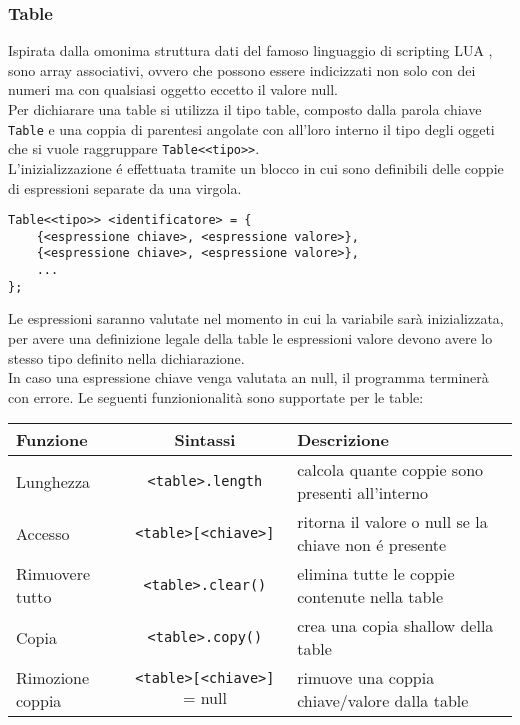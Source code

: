\subsubsection{Table}
Ispirata dalla omonima struttura dati del famoso linguaggio di scripting LUA \cite{LUA},
sono array associativi, ovvero che possono essere indicizzati non solo con dei 
numeri ma con qualsiasi oggetto eccetto il valore null. \\
Per dichiarare una table si utilizza il tipo table, composto dalla parola chiave
\lstinline|Table| e una coppia di parentesi angolate con all'loro interno il tipo degli 
oggeti che si vuole raggruppare \lstinline|Table<<tipo>>|. \\
L'inizializzazione é effettuata tramite un blocco in cui sono definibili delle coppie
di espressioni separate da una virgola.
\begin{lstlisting}
Table<<tipo>> <identificatore> = {
    {<espressione chiave>, <espressione valore>},
    {<espressione chiave>, <espressione valore>},
    ...
};
\end{lstlisting}
Le espressioni saranno valutate nel momento in cui la variabile sarà inizializzata,
per avere una definizione legale della table le espressioni valore devono avere 
lo stesso tipo definito nella dichiarazione. \\
In caso una espressione chiave venga valutata an null, il programma terminerà con errore.
Le seguenti funzionionalità sono supportate per le table: \\
\begin{center}
\begin{tabularx}{\linewidth}{| X | c | X |}
    \hline 
    Funzione & Sintassi & Descrizione \\
    \hline 
    Lunghezza & \lstinline|<table>.length| & calcola quante coppie sono presenti all'interno \\
    \hline
    Accesso & \lstinline|<table>[<chiave>]| & ritorna il valore o null se la chiave non é presente \\ 
    \hline
    Rimuovere tutto & \lstinline|<table>.clear()| & elimina tutte le coppie contenute nella table \\
    \hline
    Copia & \lstinline|<table>.copy()| & crea una copia shallow della table \\
    \hline
    Rimozione coppia & \lstinline|<table>[<chiave>]| = null & rimuove una coppia chiave/valore dalla table \\
    \hline
\end{tabularx}
\end{center}

